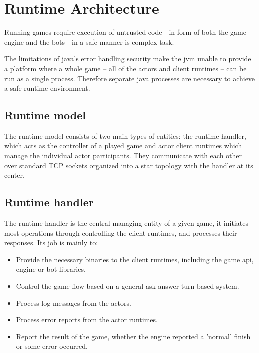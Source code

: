 \documentclass[11pt,a4paper,oneside]{report}
\begin{document}
\chapter{Runtime Architecture}\label{sect:RuntimeArch}

Running games require execution of untrusted code - in form of both the game engine and the bots - in a safe manner is complex task.

The limitations of java's error handling security make the jvm unable to provide a platform where a whole game -- all of the actors and client runtimes -- can be run as a single process. Therefore separate java processes are necessary to achieve a safe runtime environment. 

	\section{Runtime model}
	
	The runtime model consists of two main types of entities: the runtime handler, which acts as the controller of a played game and actor client runtimes which manage the individual actor participants.   
	They communicate with each other over standard TCP sockets organized into a star topology with the handler at its center.
	
	\section{Runtime handler}
	
	The runtime handler is the central managing entity of a given game, it initiates most operations through controlling the client runtimes, and processes their responses. Its job is mainly to:
	
	\begin{itemize}
		\item Provide the necessary binaries to the client runtimes, including the game api, engine or bot libraries.
	
		\item Control the game flow based on a general ask-answer turn based system.
		
		\item Process log messages from the actors.  
	
		\item Process error reports from the actor runtimes.
		
		\item Report the result of the game, whether the engine reported a 'normal' finish or some error occurred.  
	\end{itemize}
	
\end{document}
